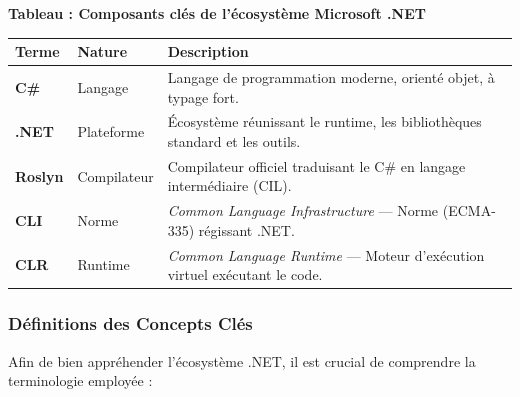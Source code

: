 \begin{center}
    \textbf{Tableau : Composants clés de l'écosystème Microsoft .NET} \\[0.3cm]
    \begin{tabular}{@{}llp{8cm}@{}}
        \toprule
        \textbf{Terme} & \textbf{Nature} & \textbf{Description} \\
        \midrule
        \textbf{C\#} & Langage & Langage de programmation moderne, orienté objet, à typage fort. \\
        \textbf{.NET} & Plateforme & Écosystème réunissant le runtime, les bibliothèques standard et les outils. \\
        \textbf{Roslyn} & Compilateur & Compilateur officiel traduisant le C\# en langage intermédiaire (CIL). \\
        \textbf{CLI} & Norme & \emph{Common Language Infrastructure} — Norme (ECMA-335) régissant .NET. \\
        \textbf{CLR} & Runtime & \emph{Common Language Runtime} — Moteur d'exécution virtuel exécutant le code. \\
        \bottomrule
    \end{tabular}
\end{center}

\subsubsection{Définitions des Concepts Clés}

Afin de bien appréhender l'écosystème .NET, il est crucial de comprendre la terminologie employée :

